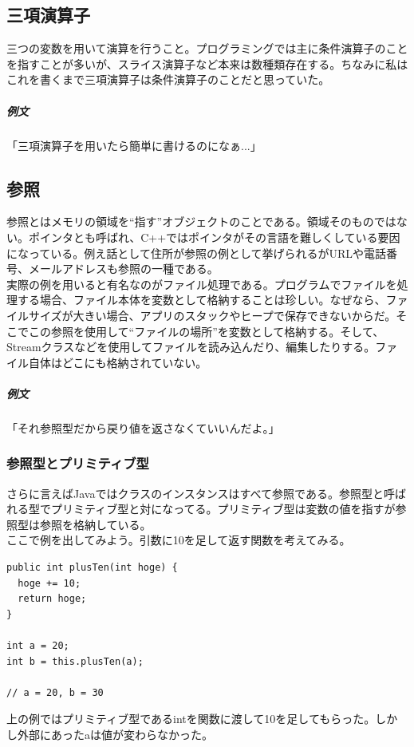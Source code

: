 \documentclass[a4paper]{ltjsreport}
\begin{document}
\subsection{三項演算子}
三つの変数を用いて演算を行うこと。プログラミングでは主に条件演算子のことを指すことが多いが、スライス演算子など本来は数種類存在する。ちなみに私はこれを書くまで三項演算子は条件演算子のことだと思っていた。

\subparagraph{例文} 「三項演算子を用いたら簡単に書けるのになぁ...」

\subsection{参照}
参照とはメモリの領域を``指す''オブジェクトのことである。領域そのものではない。ポインタとも呼ばれ、C++ではポインタがその言語を難しくしている要因になっている。例え話として住所が参照の例として挙げられるがURLや電話番号、メールアドレスも参照の一種である。
\\

実際の例を用いると有名なのがファイル処理である。プログラムでファイルを処理する場合、ファイル本体を変数として格納することは珍しい。なぜなら、ファイルサイズが大きい場合、アプリのスタックやヒープで保存できないからだ。そこでこの参照を使用して``ファイルの場所''を変数として格納する。そして、Streamクラスなどを使用してファイルを読み込んだり、編集したりする。ファイル自体はどこにも格納されていない。
\\

\subparagraph{例文} 「それ参照型だから戻り値を返さなくていいんだよ。」

\subsubsection{参照型とプリミティブ型}
さらに言えばJavaではクラスのインスタンスはすべて参照である。参照型と呼ばれる型でプリミティブ型と対になってる。プリミティブ型は変数の値を指すが参照型は参照を格納している。
\\

ここで例を出してみよう。引数に10を足して返す関数を考えてみる。
\lstset{language=Java}
\begin{lstlisting}
public int plusTen(int hoge) {
  hoge += 10;
  return hoge;
}

int a = 20;
int b = this.plusTen(a);

// a = 20, b = 30
\end{lstlisting}
上の例ではプリミティブ型であるintを関数に渡して10を足してもらった。しかし外部にあったaは値が変わらなかった。
\end{document}
